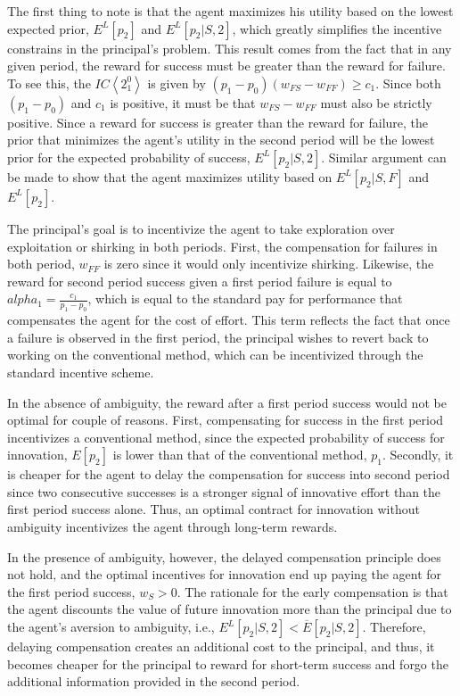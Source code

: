 \documentclass[11pt]{article} %
\theoremstyle{exampstyle}
\newcommand{\la}{ \left < }
\newcommand{\ra}{ \right > }
\begin{document}
The first thing to note is that the agent maximizes his utility based on the lowest expected prior, $E^L[p_2]$ and $E^L[p_2 |S, 2]$, which greatly simplifies the incentive constrains in the principal's problem. This result comes from the fact that in any given period, the reward for success must be greater than the reward for failure. To see this, the $IC \la 2^0_1 \ra$ is given by $(p_1-p_0) (w_{FS} - w_{FF}) \ge c_1$. Since both $(p_1 - p_0)$ and $c_1$ is positive, it must be that $w_{FS} - w_{FF}$ must also be strictly positive. Since a reward for success is greater than the reward for failure, the prior that minimizes the agent's utility in the second period will be the lowest prior for the expected probability of success, $E^L[p_2 |S, 2]$. Similar argument can be made to show that the agent maximizes utility based on $E^L[p_2 |S, F]$ and $E^L[p_2]$. 

The principal's goal is to incentivize the agent to take exploration over exploitation or shirking in both periods. First, the compensation for failures in both period, $w_{FF}$ is zero since it would only incentivize shirking. Likewise, the reward for second period success given a first period failure is equal to $alpha_1 = \frac{c_1}{p_1-p_0}$, which is equal to the standard pay for performance that compensates the agent for the cost of effort. This term reflects the fact that once a failure is observed in the first period, the principal wishes to revert back to working on the conventional method, which can be incentivized through the standard incentive scheme. 

In the absence of ambiguity, the reward after a first period success would not be optimal for couple of reasons. First, compensating for success in the first period incentivizes a conventional method, since the expected probability of success for innovation, $E[p_2]$ is lower than that of the conventional method, $p_1$. Secondly, it is cheaper for the agent to delay the compensation for success into second period since two consecutive successes is a stronger signal of innovative effort than the first period success alone. Thus, an optimal contract for innovation without ambiguity incentivizes the agent through long-term rewards.

In the presence of ambiguity, however, the delayed compensation principle does not hold, and the optimal incentives for innovation end up paying the agent for the first period success, $w_S>0$. The rationale for the early compensation is that the agent discounts the value of future innovation more than the principal due to the agent's aversion to ambiguity, i.e., $E^L[p_2|S,2] < \overline{E}[p_2|S,2]$. Therefore, delaying compensation creates an additional cost to the principal, and thus, it becomes cheaper for the principal to reward for short-term success and forgo the additional information provided in the second period.
\end{document}
